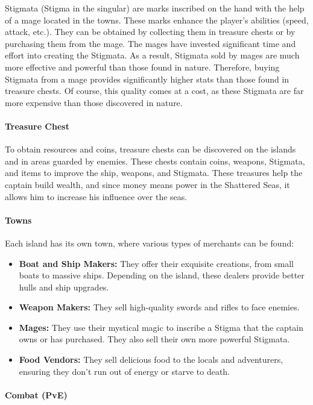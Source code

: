 \documentclass{article}
\begin{document}
Stigmata (Stigma in the singular) are marks inscribed on the hand with the help of a mage located in the towns. These marks enhance the player's abilities (speed, attack, etc.). They can be obtained by collecting them in treasure chests or by purchasing them from the mage. The mages have invested significant time and effort into creating the Stigmata. As a result, Stigmata sold by mages are much more effective and powerful than those found in nature. Therefore, buying Stigmata from a mage provides significantly higher stats than those found in treasure chests. Of course, this quality comes at a cost, as these Stigmata are far more expensive than those discovered in nature.

\paragraph{Treasure Chest}\hfill

To obtain resources and coins, treasure chests can be discovered on the islands and in areas guarded by enemies. These chests contain coins, weapons, Stigmata, and items to improve the ship, weapons, and Stigmata. These treasures help the captain build wealth, and since money means power in the Shattered Seas, it allows him to increase his influence over the seas.

\paragraph{Towns}\hfill

Each island has its own town, where various types of merchants can be found:
\begin{itemize}
    \item \textbf{Boat and Ship Makers:} They offer their exquisite creations, from small boats to massive ships. Depending on the island, these dealers provide better hulls and ship upgrades.
    \item \textbf{Weapon Makers:} They sell high-quality swords and rifles to face enemies.
    \item \textbf{Mages:} They use their mystical magic to inscribe a Stigma that the captain owns or has purchased. They also sell their own more powerful Stigmata.
    \item \textbf{Food Vendors:} They sell delicious food to the locals and adventurers, ensuring they don't run out of energy or starve to death.
\end{itemize}

\paragraph{Combat (PvE)}\hfill
\end{document}
